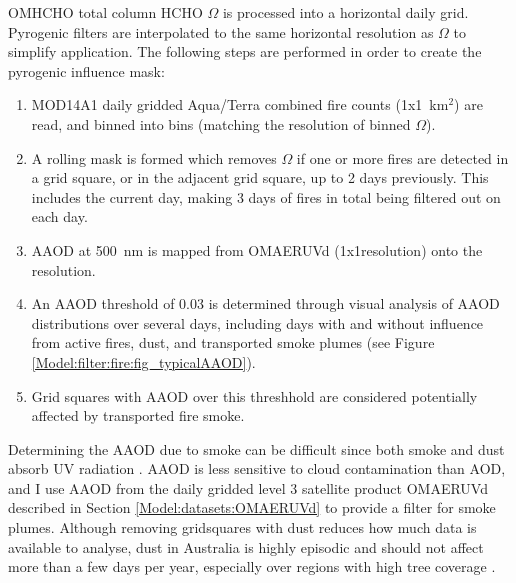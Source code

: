     OMHCHO total column HCHO $\Omega$ is processed into a \highhr horizontal daily grid.
    Pyrogenic filters are interpolated to the same horizontal resolution as $\Omega$ to simplify application. 
    The following steps are performed in order to create the pyrogenic influence mask:
    \begin{enumerate}
      \item MOD14A1 daily gridded Aqua/Terra combined fire counts (1x1~km$^2$) are read, and binned into \highhr bins (matching the resolution of binned $\Omega$).
      \item A rolling mask is formed which removes $\Omega$ if one or more fires are detected in a grid square, or in the adjacent grid square, up to 2 days previously.
      This includes the current day, making 3 days of fires in total being filtered out on each day.
      \item AAOD at 500~nm is mapped from OMAERUVd (1x1\degr resolution) onto the \highhr resolution.
      \item An AAOD threshold of 0.03 is determined through visual analysis of AAOD distributions over several days, including days with and without influence from active fires, dust, and transported smoke plumes (see Figure \ref{Model:filter:fire:fig_typicalAAOD}).
      \item Grid squares with AAOD over this threshhold are considered potentially affected by transported fire smoke.
    \end{enumerate}
  
    Determining the AAOD due to smoke can be difficult since both smoke and dust absorb UV radiation \parencite{Ahn2008,Marais2012}.
    AAOD is less sensitive to cloud contamination than AOD, and I use AAOD from the daily gridded level 3 satellite product OMAERUVd \parencite{Ahn2008} described in Section \ref{Model:datasets:OMAERUVd} to provide a filter for smoke plumes.
    Although removing gridsquares with dust reduces how much data is available to analyse, dust in Australia is highly episodic and should not affect more than a few days per year, especially over regions with high tree coverage \parencite{Shao2007}.
    
